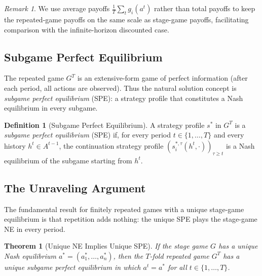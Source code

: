 \documentclass[11pt,a4paper]{article}
\theoremstyle{definition}
\newtheorem{definition}{Definition}[section]
\theoremstyle{plain}
\newtheorem{theorem}{Theorem}[section]
\theoremstyle{remark}
\newtheorem{remark}{Remark}[section]
\begin{document}
\begin{remark}
We use average payoffs $\frac{1}{T}\sum_t g_i(a^t)$ rather than total payoffs to keep
the repeated-game payoffs on the same scale as stage-game payoffs, facilitating comparison
with the infinite-horizon discounted case.
\end{remark}

\subsection{Subgame Perfect Equilibrium}

The repeated game $G^T$ is an extensive-form game of perfect information (after each period,
all actions are observed). Thus the natural solution concept is \emph{subgame perfect
equilibrium} (SPE): a strategy profile that constitutes a Nash equilibrium in every subgame.

\begin{definition}[Subgame Perfect Equilibrium]
\label{def:spe}
A strategy profile $s^*$ in $G^T$ is a \emph{subgame perfect equilibrium} (SPE) if, for
every period $t \in \{1, \ldots, T\}$ and every history $h^t \in A^{t-1}$, the
continuation strategy profile $(s_i^{*,\tau}(h^t, \cdot))_{\tau \geq t}$ is a Nash
equilibrium of the subgame starting from $h^t$.
\end{definition}

\subsection{The Unraveling Argument}

The fundamental result for finitely repeated games with a unique stage-game equilibrium is
that repetition adds nothing: the unique SPE plays the stage-game NE in every period.

\begin{theorem}[Unique NE Implies Unique SPE]
\label{thm:unraveling}
If the stage game $G$ has a unique Nash equilibrium $a^* = (a_1^*, \ldots, a_n^*)$, then
the $T$-fold repeated game $G^T$ has a unique subgame perfect equilibrium in which
$a^t = a^*$ for all $t \in \{1, \ldots, T\}$.
\end{theorem}
\end{document}
